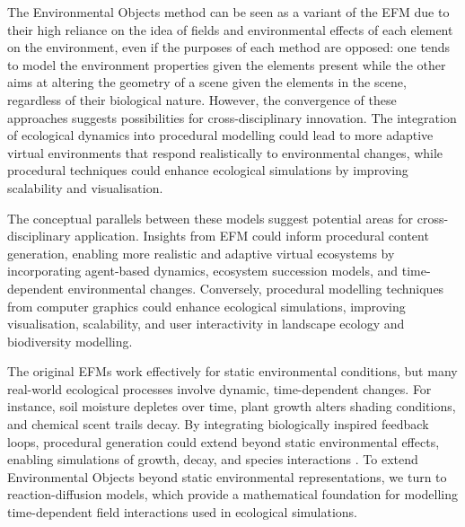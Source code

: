 
The Environmental Objects method can be seen as a variant of the EFM due to their high reliance on the idea of fields and environmental effects of each element on the environment, even if the purposes of each method are opposed: one tends to model the environment properties given the elements present while the other aims at altering the geometry of a scene given the elements in the scene, regardless of their biological nature. However, the convergence of these approaches suggests possibilities for cross-disciplinary innovation. The integration of ecological dynamics into procedural modelling could lead to more adaptive virtual environments that respond realistically to environmental changes, while procedural techniques could enhance ecological simulations by improving scalability and visualisation.

The conceptual parallels between these models suggest potential areas for cross-disciplinary application. Insights from EFM could inform procedural content generation, enabling more realistic and adaptive virtual ecosystems by incorporating agent-based dynamics, ecosystem succession models, and time-dependent environmental changes. Conversely, procedural modelling techniques from computer graphics could enhance ecological simulations, improving visualisation, scalability, and user interactivity in landscape ecology and biodiversity modelling.

The original EFMs work effectively for static environmental conditions, but many real-world ecological processes involve dynamic, time-dependent changes. For instance, soil moisture depletes over time, plant growth alters shading conditions, and chemical scent trails decay. By integrating biologically inspired feedback loops, procedural generation could extend beyond static environmental effects, enabling simulations of growth, decay, and species interactions \cite{Okubo2001,Wojtek2022}. To extend Environmental Objects beyond static environmental representations, we turn to reaction-diffusion models, which provide a mathematical foundation for modelling time-dependent field interactions used in ecological simulations.





